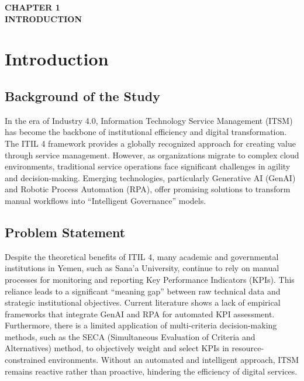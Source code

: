 \documentclass[12pt,a4paper,oneside]{report}
\begin{document}
\setcounter{chapter}{0} 

\clearpage
\thispagestyle{empty} 
\vspace*{\fill}
\begin{center}
    {\Huge\bfseries CHAPTER 1} \\[0.5cm]
    {\Huge\bfseries INTRODUCTION}
\end{center}
\vspace*{\fill}
\clearpage

\chapter{Introduction}

\section{Background of the Study}
In the era of Industry 4.0, Information Technology Service Management (ITSM) has become the backbone of institutional efficiency and digital transformation. The ITIL 4 framework provides a globally recognized approach for creating value through service management. However, as organizations migrate to complex cloud environments, traditional service operations face significant challenges in agility and decision-making. Emerging technologies, particularly Generative AI (GenAI) and Robotic Process Automation (RPA), offer promising solutions to transform manual workflows into ``Intelligent Governance'' models.

\section{Problem Statement}
Despite the theoretical benefits of ITIL 4, many academic and governmental institutions in Yemen, such as Sana'a University, continue to rely on manual processes for monitoring and reporting Key Performance Indicators (KPIs). This reliance leads to a significant ``meaning gap'' between raw technical data and strategic institutional objectives. Current literature shows a lack of empirical frameworks that integrate GenAI and RPA for automated KPI assessment. Furthermore, there is a limited application of multi-criteria decision-making methods, such as the SECA (Simultaneous Evaluation of Criteria and Alternatives) method, to objectively weight and select KPIs in resource-constrained environments. Without an automated and intelligent approach, ITSM remains reactive rather than proactive, hindering the efficiency of digital services.
\end{document}
